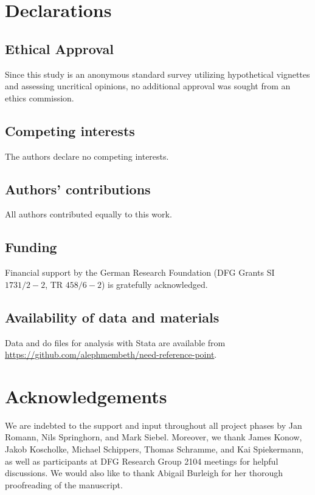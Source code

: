 \documentclass[12pt]{scrartcl}
\begin{document}
\section*{Declarations}\label{sec:declarations}

\subsection*{Ethical Approval}
Since this study is an anonymous standard survey utilizing hypothetical vignettes and assessing uncritical opinions, no additional approval was sought from an ethics commission.

\subsection*{Competing interests}
The authors declare no competing interests.

\subsection*{Authors' contributions}
All authors contributed equally to this work.

\subsection*{Funding}
Financial support by the German Research Foundation (DFG Grants SI $1731/2-2$, TR $458/6-2$) is gratefully acknowledged.

\subsection*{Availability of data and materials}
Data and do files for analysis with Stata are available from \url{https://github.com/alephmembeth/need-reference-point}.


\newpage



\section*{Acknowledgements}
We are indebted to the support and input throughout all project phases by Jan Romann, Nils Springhorn, and Mark Siebel.
Moreover, we thank James Konow, Jakob Koscholke, Michael Schippers, Thomas Schramme, and Kai Spiekermann, as well as participants at DFG Research Group 2104 meetings for helpful discussions.
We would also like to thank Abigail Burleigh for her thorough proofreading of the manuscript.
\end{document}
